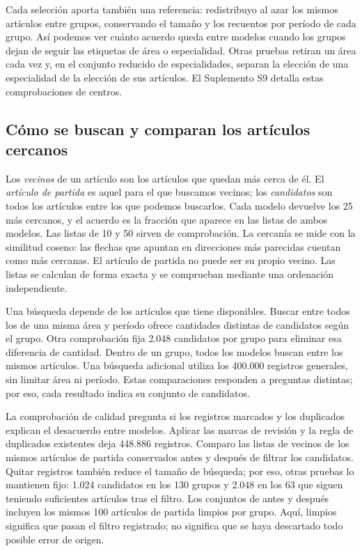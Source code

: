 \documentclass[12pt]{article}
\begin{document}
Cada selección aporta también una referencia: redistribuyo al azar los mismos artículos entre grupos, conservando el tamaño y los recuentos por período de cada grupo. Así podemos ver cuánto acuerdo queda entre modelos cuando los grupos dejan de seguir las etiquetas de área o especialidad. Otras pruebas retiran un área cada vez y, en el conjunto reducido de especialidades, separan la elección de una especialidad de la elección de sus artículos. El Suplemento S9 detalla estas comprobaciones de centros.

\subsection{Cómo se buscan y comparan los artículos cercanos}
Los \emph{vecinos} de un artículo son los artículos que quedan más cerca de él. El \emph{artículo de partida} es aquel para el que buscamos vecinos; los \emph{candidatos} son todos los artículos entre los que podemos buscarlos. Cada modelo devuelve los 25 más cercanos, y el acuerdo es la fracción que aparece en las listas de ambos modelos. Las listas de 10 y 50 sirven de comprobación. La cercanía se mide con la similitud coseno: las flechas que apuntan en direcciones más parecidas cuentan como más cercanas. El artículo de partida no puede ser su propio vecino. Las listas se calculan de forma exacta y se comprueban mediante una ordenación independiente.

Una búsqueda depende de los artículos que tiene disponibles. Buscar entre todos los de una misma área y período ofrece cantidades distintas de candidatos según el grupo. Otra comprobación fija 2.048 candidatos por grupo para eliminar esa diferencia de cantidad. Dentro de un grupo, todos los modelos buscan entre los mismos artículos. Una búsqueda adicional utiliza los 400.000 registros generales, sin limitar área ni período. Estas comparaciones responden a preguntas distintas; por eso, cada resultado indica su conjunto de candidatos.

La comprobación de calidad pregunta si los registros marcados y los duplicados explican el desacuerdo entre modelos. Aplicar las marcas de revisión y la regla de duplicados existentes deja 448.886 registros. Comparo las listas de vecinos de los mismos artículos de partida conservados antes y después de filtrar los candidatos. Quitar registros también reduce el tamaño de búsqueda; por eso, otras pruebas lo mantienen fijo: 1.024 candidatos en los 130 grupos y 2.048 en los 63 que siguen teniendo suficientes artículos tras el filtro. Los conjuntos de antes y después incluyen los mismos 100 artículos de partida limpios por grupo. Aquí, limpios significa que pasan el filtro registrado; no significa que se haya descartado todo posible error de origen.
\end{document}
